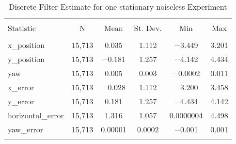 
\begin{table}[h] \centering 
  \caption{Discrete Filter Estimate for one-stationary-noiseless Experiment} 
  \label{tab:one_stationary_noiseless_discrete_summary} 
\begin{tabular}{@{\extracolsep{5pt}}lccccc} 
\\[-1.8ex]\hline 
\hline \\[-1.8ex] 
Statistic & \multicolumn{1}{c}{N} & \multicolumn{1}{c}{Mean} & \multicolumn{1}{c}{St. Dev.} & \multicolumn{1}{c}{Min} & \multicolumn{1}{c}{Max} \\ 
\hline \\[-1.8ex] 
x\_position & 15,713 & 0.035 & 1.112 & $-$3.449 & 3.201 \\ 
y\_position & 15,713 & $-$0.181 & 1.257 & $-$4.142 & 4.434 \\ 
yaw & 15,713 & 0.005 & 0.003 & $-$0.0002 & 0.011 \\ 
x\_error & 15,713 & $-$0.028 & 1.112 & $-$3.200 & 3.458 \\ 
y\_error & 15,713 & 0.181 & 1.257 & $-$4.434 & 4.142 \\ 
horizontal\_error & 15,713 & 1.316 & 1.057 & 0.0000004 & 4.498 \\ 
yaw\_error & 15,713 & 0.00001 & 0.0002 & $-$0.001 & 0.001 \\ 
\hline \\[-1.8ex] 
\end{tabular} 
\end{table} 

